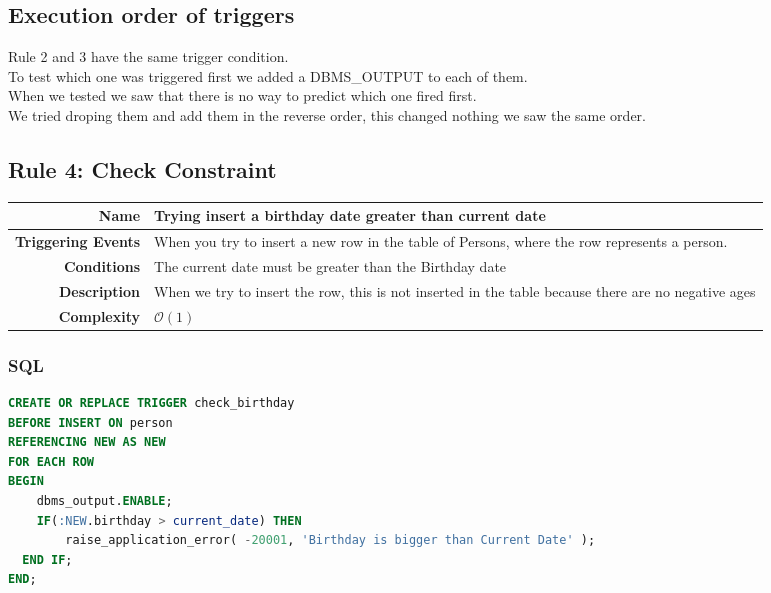 \documentclass[a4paper, 10pt]{article}
\begin{document}
\begin{minipage}\linewidth
\subsection{Execution order of triggers}
Rule 2 and 3 have the same trigger condition.\\
To test which one was triggered first we added a DBMS\_OUTPUT to each of them. \\
When we tested we saw that there is no way to predict which one fired first. \\
We tried droping them and add them in the reverse order, this changed nothing we saw the same order.
\end{minipage}


\begin{minipage}\linewidth
\subsection{Rule 4: Check Constraint}

\begin{table}[H]
\begin{tabularx}{\linewidth}{| r | X |}
\hline
\textbf{Name}              & Trying insert a birthday date greater than current date \\ \hline
\textbf{Triggering Events} & When you try to insert a new row in the table of Persons, where the row represents a person. \\ \hline
\textbf{Conditions}        & The current date must be greater than the Birthday date \\ \hline
\textbf{Description}       & When we try to insert the row, this is not inserted in the table because there are no negative ages \\ \hline
\textbf{Complexity}        & $\mathcal{O}(1)$  \\ \hline
\end{tabularx}
\end{table}

\subsubsection{SQL}
\begin{lstlisting}[language=SQL]
  CREATE OR REPLACE TRIGGER check_birthday
BEFORE INSERT ON person
REFERENCING NEW AS NEW 
FOR EACH ROW
BEGIN
	dbms_output.ENABLE; 
	IF(:NEW.birthday > current_date) THEN
    	raise_application_error( -20001, 'Birthday is bigger than Current Date' );
  END IF;
END;
\end{lstlisting}


\end{minipage}
\end{document}
